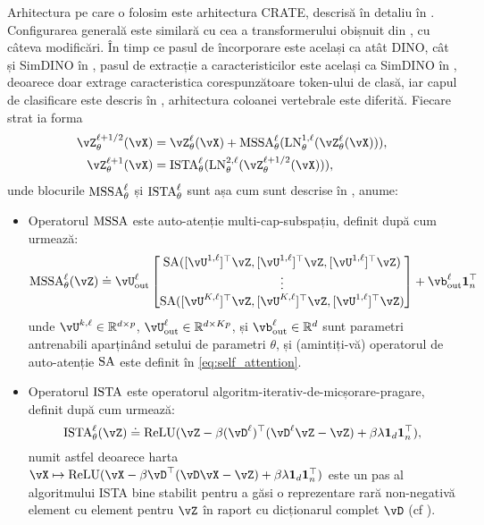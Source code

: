 \documentclass[../../book-main_ro.tex]{subfiles}
\begin{document}
Arhitectura pe care o folosim este arhitectura CRATE, descrisă în detaliu în . Configurarea generală este similară cu cea a transformerului obișnuit din , cu câteva modificări. În timp ce pasul de încorporare este același ca atât DINO, cât și SimDINO în , pasul de extracție a caracteristicilor este același ca SimDINO în , deoarece doar extrage caracteristica corespunzătoare token-ului de clasă, iar capul de clasificare este descris în , arhitectura coloanei vertebrale este diferită. Fiecare strat ia forma
\begin{align}\label{eq:CARTE updates}
    \vZ_{\theta}^{\ell + 1/2}(\vX)
    &= \vZ_{\theta}^{\ell}(\vX) + \MSSA_{\theta}^{\ell}(\LN_{\theta}^{1, \ell}(\vZ_{\theta}^{\ell}(\vX))), \\ 
    \vZ_{\theta}^{\ell + 1}(\vX)
    &= \ISTA_{\theta}^{\ell}(\LN_{\theta}^{2, \ell}(\vZ_{\theta}^{\ell + 1/2}(\vX))),
\end{align}
unde blocurile \(\operatorname{MSSA}_{\theta}^{\ell}\) și \(\operatorname{ISTA}_{\theta}^{\ell}\) sunt așa cum sunt descrise în , anume:
\begin{itemize}
    \item Operatorul \(\operatorname{MSSA}\) este auto-atenție multi-cap-subspațiu, definit după cum urmează:
    \begin{equation}
        \MSSA_{\theta}^{\ell}(\vZ) \doteq \vU_{\out}^{\ell}\mat{\SA([\vU^{1, \ell}]^{\top}\vZ, [\vU^{1, \ell}]^{\top}\vZ, [\vU^{1, \ell}]^{\top}\vZ)\\ \vdots \\ \SA([\vU^{K, \ell}]^{\top}\vZ, [\vU^{K, \ell}]^{\top}\vZ, [\vU^{1, \ell}]^{\top}\vZ)} + \vb_{\out}^{\ell}\vone_{n}^{\top}
    \end{equation}
    unde \(\vU^{k, \ell} \in \R^{d \times p}\), \(\vU_{\out}^{\ell} \in \R^{d \times Kp}\), și \(\vb_{\out}^{\ell} \in \R^{d}\) sunt parametri antrenabili aparținând setului de parametri \(\theta\), și (amintiți-vă) operatorul de auto-atenție \(\operatorname{SA}\) este definit în \eqref{eq:self_attention}.
    \item Operatorul \(\operatorname{ISTA}\) este operatorul algoritm-iterativ-de-micșorare-pragare, definit după cum urmează:
    \begin{equation}
        \ISTA_{\theta}^{\ell}(\vZ) \doteq \ReLU(\vZ - \beta (\vD^{\ell})^{\top}(\vD^{\ell}\vZ - \vZ) + \beta\lambda \vone_{d}\vone_{n}^{\top}),
    \end{equation}
    numit astfel deoarece harta \(\vX \mapsto \ReLU(\vX - \beta \vD^{\top}(\vD\vX - \vZ) + \beta  \lambda \vone_{d}\vone_{n}^{\top})\) este un pas al algoritmului ISTA bine stabilit pentru a găsi o reprezentare rară non-negativă element cu element pentru \(\vZ\) în raport cu dicționarul complet \(\vD\) (cf ).
\end{itemize}
\end{document}
